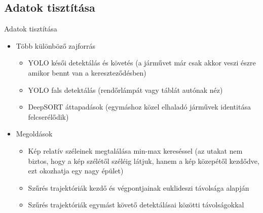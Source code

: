 \documentclass{beamer}
\begin{document}
\subsection{Adatok tisztítása}
\begin{frame}{Adatok tisztítása}
    \begin{itemize}
        \item Több különböző zajforrás
        \begin{itemize}
            \item YOLO késői detektálás és követés (a járművet már csak akkor veszi észre amikor bennt van a kereszteződésben)
            \item YOLO fals detektálás (rendőrlámpát vagy táblát autónak néz)
            \item DeepSORT áttapadások (egymáshoz közel elhaladó járművek identitása felcserélődik)
        \end{itemize} 
        \item Megoldások
        \begin{itemize}
            \item Kép relatív széleinek megtalálása min-max kereséssel (az utakat nem biztos, hogy a kép szélétől széléig látjuk, hanem a kép közepétől kezdődve, ezt okozhatja egy nagy épület)
            \item Szűrés trajektóriák kezdő és végpontjainak euklideszi távolsága alapján
            \item Szűrés trajektóriák egymást követő detektálásai közötti távolságokkal
        \end{itemize} 
    \end{itemize}   
\end{frame}
\end{document}
